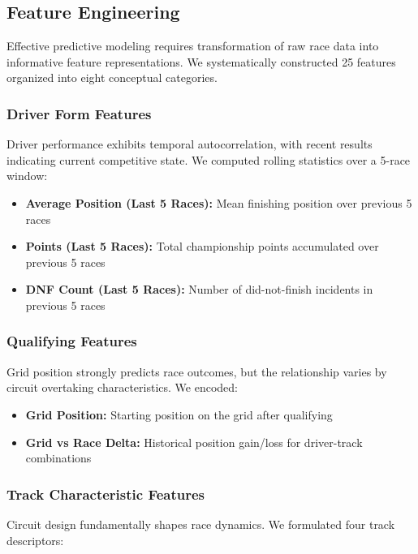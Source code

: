\documentclass[conference]{IEEEtran}
\begin{document}
\subsection{Feature Engineering}

Effective predictive modeling requires transformation of raw race data into informative feature representations. We systematically constructed 25 features organized into eight conceptual categories.

\subsubsection{Driver Form Features}

Driver performance exhibits temporal autocorrelation, with recent results indicating current competitive state. We computed rolling statistics over a 5-race window:

\begin{itemize}
    \item \textbf{Average Position (Last 5 Races):} Mean finishing position over previous 5 races
    \item \textbf{Points (Last 5 Races):} Total championship points accumulated over previous 5 races
    \item \textbf{DNF Count (Last 5 Races):} Number of did-not-finish incidents in previous 5 races
\end{itemize}

\subsubsection{Qualifying Features}

Grid position strongly predicts race outcomes, but the relationship varies by circuit overtaking characteristics. We encoded:

\begin{itemize}
    \item \textbf{Grid Position:} Starting position on the grid after qualifying
    \item \textbf{Grid vs Race Delta:} Historical position gain/loss for driver-track combinations
\end{itemize}

\subsubsection{Track Characteristic Features}

Circuit design fundamentally shapes race dynamics. We formulated four track descriptors:
\end{document}
